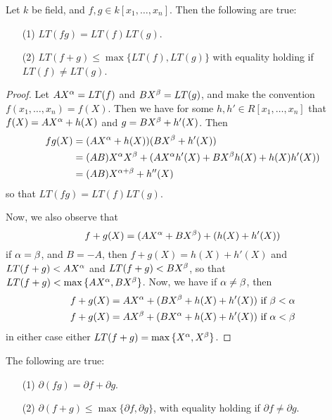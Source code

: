 \begin{proposition}\label{proposition_7.6.2}
  Let $k$ be field, and $f,g \in k[x_1, \dots, x_n]$. Then
  the following are true:
  \begin{enumerate}
    \item[(1)] $LT(fg)=LT(f)LT(g)$.

    \item[(2)] $LT(f+g) \leq \max{\{LT(f), LT(g)\}}$ with equality
      holding if $LT(f) \neq LT(g)$.
  \end{enumerate}
\end{proposition}
\begin{proof}
  Let $AX^\alpha=LT(f)$ and $BX^\beta=LT(g)$, and make the convention $f(x_1,
  \dots, x_n)=f(X)$. Then we have for some $h,h' \in R[x_1, \dots,
  x_n]$ that $f(X)=AX^\alpha+h(X)$ and $g=BX^\beta+h'(X)$. Then
  \begin{align*}
    fg(X) &=  (AX^\alpha+h(X))(BX^\beta+h'(X))  \\
          &= (AB)X^\alpha X^\beta+(AX^\alpha h'(X)+BX^\beta h(X)+h(X)h'(X))  \\
          &=  (AB)X^{\alpha+\beta}+h''(X)  \\
  \end{align*}
  so that $LT(fg)=LT(f)LT(g)$.

  Now, we also observe that
  \begin{equation*}
    f+g(X)=(AX^\alpha+BX^\beta)+(h(X)+h'(X))
  \end{equation*}
  if $\alpha=\beta$, and $B=-A$, then $f+g(X)=h(X)+h'(X)$ and $LT(f+g)<AX^\alpha$
  and $LT(f+g)<BX^\beta$, so that $LT(f+g)<\max{\{AX^\alpha,BX^\beta\}}$. Now, we have
  if  $\alpha \neq \beta$, then
  \begin{align*}
    f+g(X)=AX^\alpha+(BX^\beta+h(X)+h'(X))  & \text{ if } \beta < \alpha  \\
    f+g(X)=AX^\beta+(BX^\alpha+h(X)+h'(X))  & \text{ if } \alpha < \beta  \\
  \end{align*}
  in either case either $LT(f+g)=\max{\{X^\alpha,X^\beta\}}$.
\end{proof}
\begin{corollary}
  The following are true:
  \begin{enumerate}
    \item[(1)] $\partial{(fg)}=\partial{f}+\partial{g}$.

    \item[(2)] $\partial{(f+g)} \leq \max{\{\partial{f},
      \partial{g}\}}$, with equality holding if $\partial{f} \neq
      \partial{g}$.
  \end{enumerate}
\end{corollary}


